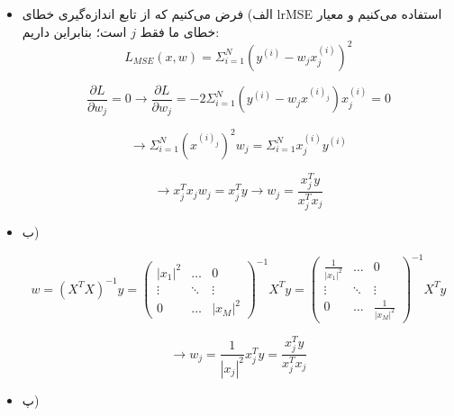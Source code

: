 
\begin{itemize}
	\item الف)
	فرض می‌کنیم که از تابع اندازه‌گیری خطای lr{MSE} استفاده می‌کنیم و معیار خطای ما فقط $j$ است؛ بنابراین داریم:
	$$
	L_{MSE}(x, w) = \Sigma_{i = 1}^{N} (y^{(i)} - w_jx^{(i)}_j)^2
	$$
	
	$$
	\frac{\partial L}{\partial w_j} = 0
	\rightarrow
	\frac{\partial L}{\partial w_j} = -2 \Sigma_{i = 1}^N(y^{(i)} - w_jx^{(i)_j})x^{(i)}_j = 0
	$$
	
	$$
	\rightarrow \Sigma_{i = 1}^N (x^{(i)_j})^2 w_j = \Sigma_{i = 1}^N x_j^{(i)}y^{(i)}
	$$
	
	$$	
	\rightarrow x^T_jx_jw_j = x_j^Ty \rightarrow w_j = \frac{x_j^Ty}{x_j^Tx_j}
	$$
	\item ب)
	
	$$
	w = (X^TX)^{-1}y = \begin{pmatrix}
		|x_1|^2 & \dots & 0 \\
		\vdots & \ddots & \vdots\\
		0 & \dots & |x_M|^2
	\end{pmatrix}^{-1}X^Ty = \begin{pmatrix}
	\frac{1}{|x_1|^2} & \dots & 0 \\
	\vdots & \ddots & \vdots\\
	0 & \dots & \frac{1}{|x_M|^2}
	\end{pmatrix}^{-1}X^Ty
	$$
	
	$$
	\rightarrow w_j = \frac{1}{|x_j|^2}x_j^Ty= \frac{x_j^Ty}{x_j^Tx_j}
	$$
	\item پ)
\end{itemize}